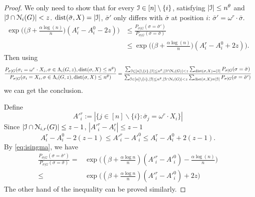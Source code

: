 \documentclass{article}
\begin{document}
\begin{proof}
	We only need to show that for every $\mathcal{I}\in [n]\setminus\{i\}$, satisfying $|\mathcal{I}|\le n^\theta$ and
	$|\mathcal{I} \cap \mathcal{N}_i(G)| < z$. $\operatorname{dist}(\bar{\sigma}, X) = |\mathcal{I}|$, $\bar{\sigma}'$ only differs with $\bar{\sigma}$ at
	position $i$: $\bar{\sigma}' = \omega^r \cdot \bar{\sigma}$.
	\begin{equation} \label{eq:qk}
	\begin{aligned}
	\exp\Big(\big(\beta+\frac{\alpha\log(n)}{n} \big) (A^r_i-A^0_i - 2z) \Big) & \le 
	\frac{P_{\sigma|G}(\sigma= \bar{\sigma}') } { P_{\sigma|G}(\sigma= \bar{\sigma} ) } \\
	& \le \exp\Big(\big(\beta+\frac{\alpha\log(n)}{n} \big) (A^r_i-A^0_i + 2z) \Big) .
	\end{aligned}
	\end{equation}
	Then using 
	$$
	\frac{P_{\sigma|G}(\sigma_i= \omega^r \cdot X_i, \sigma\in \Lambda_i(G,z) ,\operatorname{dist}(\sigma, X) \le n^{\theta} ) } 
	{ P_{\sigma|G}(\sigma_i=X_i, \sigma\in \Lambda_i(G,z) ,\operatorname{dist}(\sigma, X) \le n^{\theta} ) } 
	= \frac{\sum_{\mathcal{I}\in [n]\setminus\{i\},|\mathcal{I}|\le n^\theta,|\mathcal{I} \cap \mathcal{N}_i(G)| < z}\sum_{\operatorname{dist}(\sigma, X)=|\mathcal{I}|} P_{\sigma|G}(\sigma= \bar{\sigma} ) }
	{\sum_{\mathcal{I}\in [n]\setminus\{i\},|\mathcal{I}|\le n^\theta,|\mathcal{I} \cap \mathcal{N}_i(G)| < z}\sum_{\operatorname{dist}(\sigma, X)=|\mathcal{I}|} P_{\sigma|G}(\sigma = \bar{\sigma}' ) } 
	$$
	we can get the conclusion.
	
	Define
	$$
	A'^r_i := |\{ j \in [n]\backslash \{i\}:  \bar{\sigma}_j = \omega^r \cdot X_i \}|
	$$
	Since $|\mathcal{I}\cap \mathcal{N}_{i,r}(G)| \le z-1$, $|A'^r_i - A^r_i| \leq z-1$
	\begin{equation} \label{eq:oo}
	A^r_i-A^0_i-2(z-1) \le A'^r_i-A'^0_i\le A^r_i-A^0_i+2(z-1) .
	\end{equation}
	By \eqref{eq:isingma}, we have
	\begin{align*}
	 \frac{P_{\sigma|G}(\sigma=  \bar{\sigma}' ) } { P_{\sigma|G}(\sigma= \bar{\sigma}) }
	= & \exp\Big((\beta+\frac{\alpha\log n }{n})(A'^r_i-A'^0_i)
	-\frac{\alpha\log(n)}{n}
	\Big)
	\\
	\leq & \exp\Big((\beta+\frac{\alpha\log n }{n})(A'^r_i-A'^0_i)+2z \Big)
	\end{align*}
	The other hand of the inequality can be proved similarly.
\end{proof}
\end{document}
